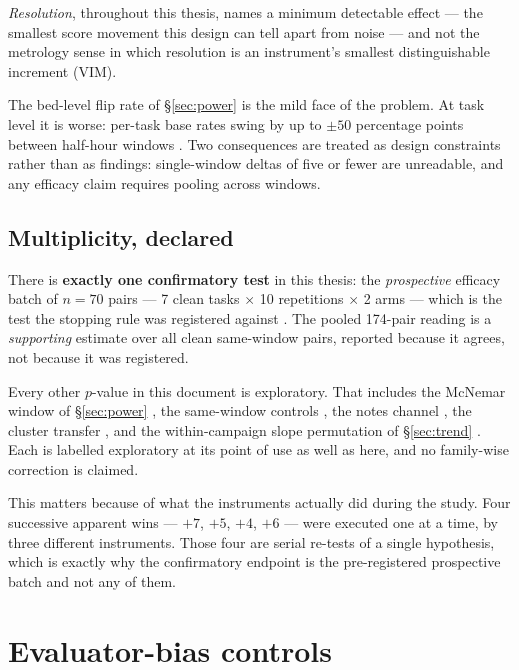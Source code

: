 \emph{Resolution}, throughout this thesis, names a minimum detectable
effect --- the smallest score movement this design can tell apart from
noise --- and not the metrology sense in which resolution is an
instrument's smallest distinguishable increment (VIM).

The bed-level flip rate of \S\ref{sec:power} is the mild face of the
problem. At task level it is worse: per-task base rates swing by up to
$\pm 50$ percentage points between half-hour windows . Two
consequences are treated as design constraints rather than as findings:
single-window deltas of five or fewer are unreadable, and any efficacy
claim requires pooling across windows.

\subsection*{Multiplicity, declared}

There is \textbf{exactly one confirmatory test} in this thesis: the
\emph{prospective} efficacy batch of $n{=}70$ pairs --- 7 clean tasks
$\times$ 10 repetitions $\times$ 2 arms --- which is the test the stopping
rule was registered against . The pooled 174-pair reading is a
\emph{supporting} estimate over all clean same-window pairs, reported
because it agrees, not because it was registered.

Every other $p$-value in this document is exploratory. That includes the
McNemar window of \S\ref{sec:power} , the same-window controls
, the notes channel , the cluster transfer , and the
within-campaign slope permutation of \S\ref{sec:trend} . Each is
labelled exploratory at its point of use as well as here, and no
family-wise correction is claimed.

This matters because of what the instruments actually did during the study.
Four successive apparent wins --- $+7$, $+5$, $+4$, $+6$ --- were executed
one at a time, by three different instruments. Those four are serial
re-tests of a single hypothesis, which is exactly why the confirmatory
endpoint is the pre-registered prospective batch and not any of them.

\section{Evaluator-bias controls}
\label{sec:evaluator-bias}

